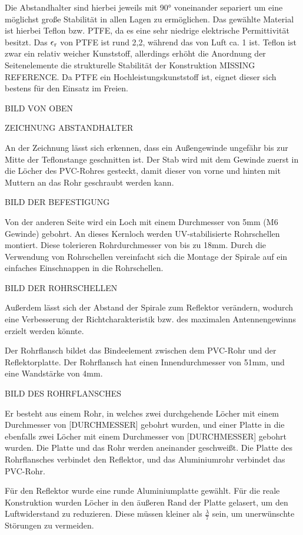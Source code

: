 Die Abstandhalter sind hierbei jeweils mit 90° voneinander separiert um eine möglichst große Stabilität in allen Lagen zu ermöglichen. Das gewählte Material ist hierbei Teflon bzw. PTFE, da es eine sehr niedrige elektrische Permittivität besitzt. Das $\epsilon\textsubscript{r}$ von PTFE ist rund 2,2, während das von Luft ca. 1 ist. Teflon ist zwar ein relativ weicher Kunststoff, allerdings erhöht die Anordnung der Seitenelemente die strukturelle Stabilität der Konstruktion MISSING REFERENCE. Da PTFE ein Hochleistungskunststoff ist, eignet dieser sich bestens für den Einsatz im Freien.

BILD VON OBEN

ZEICHNUNG ABSTANDHALTER

An der Zeichnung lässt sich erkennen, dass ein Außengewinde ungefähr bis zur Mitte der Teflonstange geschnitten ist. Der Stab wird mit dem Gewinde zuerst in die Löcher des PVC-Rohres gesteckt, damit dieser von vorne und hinten mit Muttern an das Rohr geschraubt werden kann.

BILD DER BEFESTIGUNG

Von der anderen Seite wird ein Loch mit einem Durchmesser von 5mm (M6 Gewinde) gebohrt. An dieses Kernloch werden UV-stabilisierte Rohrschellen montiert. Diese tolerieren Rohrdurchmesser von bis zu 18mm. Durch die Verwendung von Rohrschellen vereinfacht sich die Montage der Spirale auf ein einfaches Einschnappen in die Rohrschellen.

BILD DER ROHRSCHELLEN

Außerdem lässt sich der Abstand der Spirale zum Reflektor verändern, wodurch eine Verbesserung der Richtcharakteristik bzw. des maximalen Antennengewinns erzielt werden könnte.

Der Rohrflansch bildet das Bindeelement zwischen dem PVC-Rohr und der Reflektorplatte. Der Rohrflansch hat einen Innendurchmesser von 51mm, und eine Wandstärke von 4mm.

BILD DES ROHRFLANSCHES

Er besteht aus einem Rohr, in welches zwei durchgehende Löcher mit einem Durchmesser von [DURCHMESSER] gebohrt wurden, und einer Platte in die ebenfalls zwei Löcher mit einem Durchmesser von [DURCHMESSER] gebohrt wurden. Die Platte und das Rohr werden aneinander geschweißt. Die Platte des Rohrflansches verbindet den Reflektor, und das Aluminiumrohr verbindet das PVC-Rohr.

Für den Reflektor wurde eine runde Aluminiumplatte gewählt. Für die reale Konstruktion wurden Löcher in den äußeren Rand der Platte gelasert, um den Luftwiderstand zu reduzieren. Diese müssen kleiner als $\frac{\lambda}{7}$ sein, um unerwünschte Störungen zu vermeiden.

